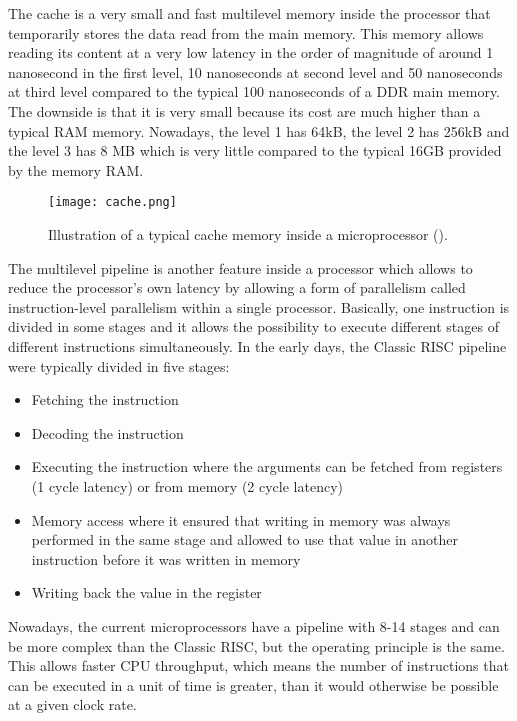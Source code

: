 \par
The cache is a very small and fast multilevel memory inside the processor that temporarily stores the data read from the main memory.
This memory allows reading its content at a very low latency in the order of magnitude of around 1 nanosecond in the first level, 10 nanoseconds at second level and 50 nanoseconds at third level compared to the typical 100 nanoseconds of a DDR main memory.
The downside is that it is very small because its cost are much higher than a typical RAM memory.
Nowadays, the level 1 has 64kB, the level 2 has 256kB and the level 3 has 8 MB which is very little compared to the typical 16GB provided by the memory RAM.

\begin{figure}[H]
	\centering
	\caption{Illustration of a typical cache memory inside a microprocessor (\cite{CPU_Cache}).}
	\label{Cache.}
	\texttt{[image: cache.png]}
\end{figure}

\par
The multilevel pipeline is another feature inside a processor which allows to reduce the processor's own latency by allowing a form of parallelism called instruction-level parallelism within a single processor.
Basically, one instruction is divided in some stages and it allows the possibility to execute different stages of different instructions simultaneously.
In the early days, the Classic RISC pipeline were typically divided in five stages:
\begin{itemize}  
	\item Fetching the instruction
	\item Decoding the instruction
	\item Executing the instruction where the arguments can be fetched from registers (1 cycle latency) or from memory (2 cycle latency)
	\item Memory access where it ensured that writing in memory was always performed in the same stage and allowed to use that value in another instruction before it was written in memory
	\item Writing back the value in the register
\end{itemize}
Nowadays, the current microprocessors have a pipeline with 8-14 stages and can be more complex than the Classic RISC, but the operating principle is the same.
This allows faster CPU throughput, which means the number of instructions that can be executed in a unit of time is greater, than it would otherwise be possible at a given clock rate.

